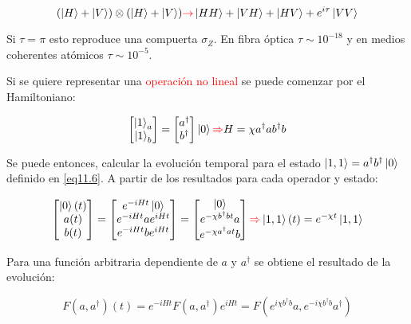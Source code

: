 \documentclass{book}
\begin{document}
\begin{equation}\label{eq11.5}(\ket{H}+\ket{V})\otimes(\ket{H}+\ket{V})\textcolor{red}{\rightarrow} \ket{HH}+\ket{VH}+\ket{HV}+e^{i\tau}\ket{VV}\end{equation}

Si $\tau=\pi$ esto reproduce una compuerta $\sigma_Z$. En fibra óptica $\tau\sim 10^{-18}$ y en medios coherentes atómicos $\tau\sim 10^{-5}$. 

Si se quiere representar una \textcolor{red}{operación no lineal} se puede comenzar por el Hamiltoniano:

\begin{equation}\label{eq11.6}\begin{bmatrix}\ket{1}_a\\\ket{1}_b\end{bmatrix}=\begin{bmatrix}a^\dag\\b^\dag\end{bmatrix}\ket{0}\textcolor{red}{\Rightarrow}H=\chi a^\dag a b^\dag b\end{equation}

Se puede entonces, calcular la evolución temporal para el estado $\ket{1,1}=a^\dag b^\dag \ket{0}$ definido en \ref{eq11.6}. A partir de los resultados para cada operador y estado:

\begin{equation}\label{eq11.7}\begin{bmatrix}\ket{0}(t)\\ a(t)\\b(t)\end{bmatrix}=\begin{bmatrix}e^{-iHt}\ket{0}\\ e^{-iHt}ae^{iHt}\\ e^{-iHt}be^{iHt} \end{bmatrix}=\begin{bmatrix}\ket{0}\\e^{-\chi b^\dag bt}a \\ e^{-\chi a^\dag a t}b\end{bmatrix}\textcolor{red}{\Rightarrow} \ket{1,1}(t)=e^{-\chi t}\ket{1,1}\end{equation}

Para una función arbitraria dependiente de $a$ y $a^\dag$ se obtiene el resultado de la evolución:

\begin{equation}\label{eq11.8}F(a,a^\dag)(t)=e^{-iHt}F(a,a^\dag) e^{iHt}=F(e^{i\chi b^\dag b}a, e^{-i\chi b^\dag b}a^\dag)\end{equation}
\end{document}
